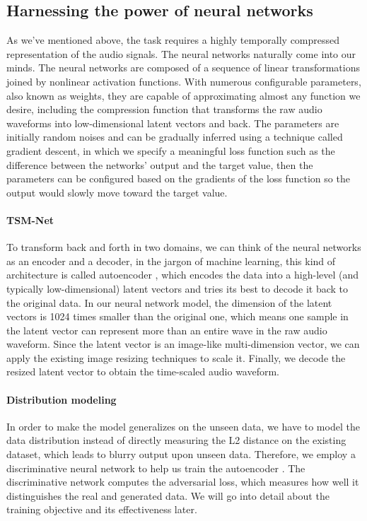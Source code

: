 \documentclass[12pt]{article}
\begin{document}
\subsection{Harnessing the power of neural networks}
As we've mentioned above, the task requires a highly temporally compressed representation of the audio signals. The neural networks naturally come into our minds. The neural networks are composed of a sequence of linear transformations joined by nonlinear activation functions. With numerous configurable parameters, also known as weights, they are capable of approximating almost any function we desire, including the compression function that transforms the raw audio waveforms into low-dimensional latent vectors and back. The parameters are initially random noises and can be gradually inferred using a technique called gradient descent, in which we specify a meaningful loss function such as the difference between the networks' output and the target value, then the parameters can be configured based on the gradients of the loss function so the output would slowly move toward the target value.

\paragraph{TSM-Net}
To transform back and forth in two domains, we can think of the neural networks as an encoder and a decoder, in the jargon of machine learning, this kind of architecture is called autoencoder \cite{kra91}, which encodes the data into a high-level (and typically low-dimensional) latent vectors and tries its best to decode it back to the original data. In our neural network model, the dimension of the latent vectors is 1024 times smaller than the original one, which means one sample in the latent vector can represent more than an entire wave in the raw audio waveform. Since the latent vector is an image-like multi-dimension vector, we can apply the existing image resizing techniques to scale it. Finally, we decode the resized latent vector to obtain the time-scaled audio waveform.

\paragraph{Distribution modeling}
In order to make the model generalizes on the unseen data, we have to model the data distribution instead of directly measuring the L2 distance on the existing dataset, which leads to blurry output upon unseen data. Therefore, we employ a discriminative neural network to help us train the autoencoder \cite{goo14}. The discriminative network computes the adversarial loss, which measures how well it distinguishes the real and generated data. We will go into detail about the training objective and its effectiveness later.
\end{document}
